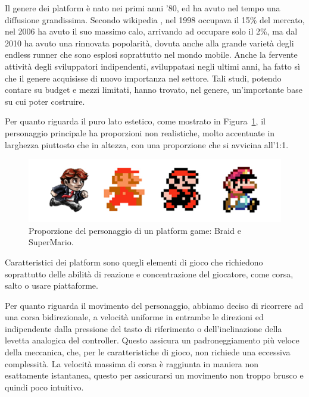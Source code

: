 Il genere dei platform è nato nei primi anni ’80, ed ha avuto nel tempo una diffusione grandissima. Secondo wikipedia \cite{platform_wikipedia} , nel 1998 occupava il 15\% del mercato, nel 2006 ha avuto il suo massimo calo, arrivando ad occupare solo il 2\%, ma dal 2010 ha avuto una rinnovata popolarità, dovuta anche alla grande varietà degli endless runner che sono esplosi soprattutto nel mondo mobile. Anche la fervente attività degli sviluppatori indipendenti, sviluppatasi negli ultimi anni, ha fatto sì che il genere acquisisse di nuovo importanza nel settore. Tali studi, potendo contare su budget e mezzi limitati, hanno trovato, nel genere, un’importante base su cui poter costruire.

Per quanto riguarda il puro lato estetico, come mostrato in Figura~\ref{fig:platform_proportions}, il personaggio principale ha proporzioni non realistiche, molto accentuate in larghezza piuttosto che in altezza, con una proporzione che si avvicina all'1:1.

\begin{figure}%
	\centering
	\includegraphics[width= 0.9\columnwidth]{images/gameDesign/02_braid_SM.jpg}
	\caption{Proporzione del personaggio di un platform game: Braid e SuperMario.}
	\label{fig:platform_proportions}
\end{figure}

Caratteristici dei platform sono quegli elementi di gioco che richiedono soprattutto delle abilità di reazione e concentrazione del giocatore, come corsa, salto o usare piattaforme.

Per quanto riguarda il movimento del personaggio, abbiamo deciso di ricorrere ad una corsa bidirezionale, a velocità uniforme in entrambe le direzioni ed indipendente dalla pressione del tasto di riferimento o dell’inclinazione della levetta analogica del controller. Questo assicura un padroneggiamento più veloce della meccanica, che, per le caratteristiche di gioco, non richiede una eccessiva complessità.
La velocità massima di corsa è raggiunta in maniera non esattamente istantanea, questo per assicurarsi un movimento non troppo brusco e quindi poco intuitivo.


